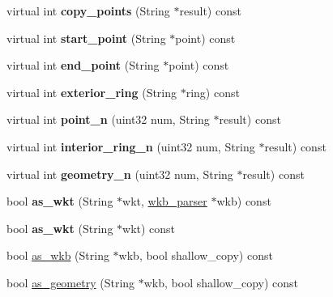 \begin{DoxyCompactItemize}
\item 
\mbox{\label{classGeometry_aecc8ba74dae54a9209e4e802c1804b84}} 
virtual int {\bfseries copy\+\_\+points} (String $\ast$result) const
\item 
\mbox{\label{classGeometry_add9e1a5e2c27e4319b1a3b0b37a6def3}} 
virtual int {\bfseries start\+\_\+point} (String $\ast$point) const
\item 
\mbox{\label{classGeometry_aeca60da99fbd52874c2fe8d4e9d90d3f}} 
virtual int {\bfseries end\+\_\+point} (String $\ast$point) const
\item 
\mbox{\label{classGeometry_ac21bb25b6222e03ae4f4cd626d1751d8}} 
virtual int {\bfseries exterior\+\_\+ring} (String $\ast$ring) const
\item 
\mbox{\label{classGeometry_a8a7311ea43a14cdaa24c597d6ef321e3}} 
virtual int {\bfseries point\+\_\+n} (uint32 num, String $\ast$result) const
\item 
\mbox{\label{classGeometry_aa1aaee8658f1ba7066cd44ca26fd66b0}} 
virtual int {\bfseries interior\+\_\+ring\+\_\+n} (uint32 num, String $\ast$result) const
\item 
\mbox{\label{classGeometry_ac1a5f97df1540679417a1e8ce027c12a}} 
virtual int {\bfseries geometry\+\_\+n} (uint32 num, String $\ast$result) const
\item 
\mbox{\label{classGeometry_a182ecbd492ac4b00fb7a38ea2c9ba328}} 
bool {\bfseries as\+\_\+wkt} (String $\ast$wkt, \mbox{\hyperlink{classGeometry_1_1wkb__parser}{wkb\+\_\+parser}} $\ast$wkb) const
\item 
\mbox{\label{classGeometry_a791e0c88c0e4615eef1ac631c76e107e}} 
bool {\bfseries as\+\_\+wkt} (String $\ast$wkt) const
\item 
bool \mbox{\hyperlink{classGeometry_aeb83e5312a7333a7e908d0623b170c97}{as\+\_\+wkb}} (String $\ast$wkb, bool shallow\+\_\+copy) const
\item 
bool \mbox{\hyperlink{classGeometry_a3ac495912c005505a92b61d848f6db3f}{as\+\_\+geometry}} (String $\ast$wkb, bool shallow\+\_\+copy) const

\end{DoxyCompactItemize}
